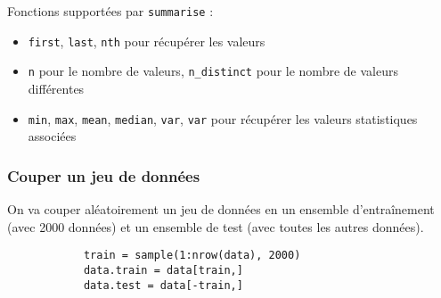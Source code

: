         Fonctions supportées par \lstinline{summarise} :
        \begin{itemize}
            \item \lstinline{first}, \lstinline{last}, \lstinline{nth} pour récupérer les valeurs
            \item \lstinline{n} pour le nombre de valeurs, \lstinline{n_distinct} pour le nombre de valeurs différentes
            \item \lstinline{min}, \lstinline{max}, \lstinline{mean}, \lstinline{median}, \lstinline{var}, \lstinline{var} pour récupérer les valeurs statistiques associées
        \end{itemize}

    \subsubsection{Couper un jeu de données}
        On va couper aléatoirement un jeu de données en un ensemble d'entraînement (avec 2000 données) et un ensemble de test (avec toutes les autres données).

        \begin{lstlisting}
            train = sample(1:nrow(data), 2000)
            data.train = data[train,]
            data.test = data[-train,]
        \end{lstlisting}